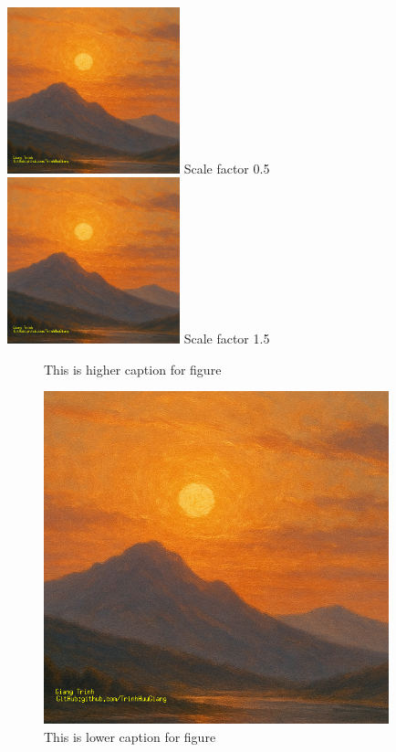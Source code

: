 \documentclass[12pt, a4paper, twoside]{report}
\begin{document}
\includegraphics[width=5cm, keepaspectratio=true, angle=20, scale=0.5]{./sunset.png} Scale factor 0.5\\

\includegraphics[width=5cm, keepaspectratio=true, angle=20, scale=1.5]{./sunset.png} Scale factor 1.5\\

\newpage

\begin{figure}[H]
               
    \centering

    \caption{This is higher caption for figure}

    {
           
        \includegraphics[width=10cm]{./sunset.png}
    }

    \caption{This is lower caption for figure}

    \label{fig:myfirstfigure}

\end{figure}
\end{document}
